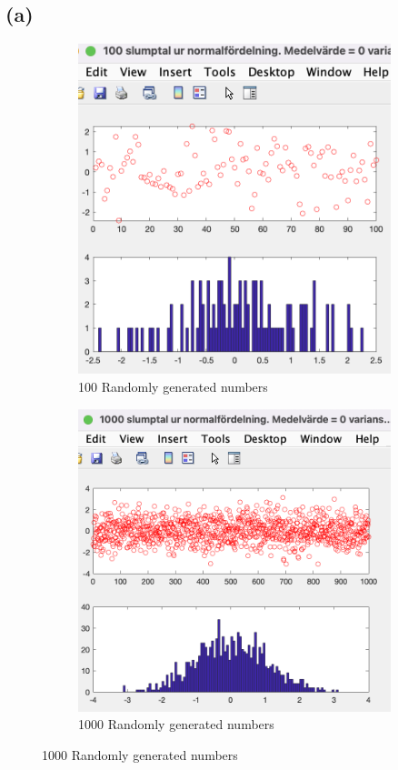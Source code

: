 \documentclass{article}
\begin{document}
\subsection{(a)}
\begin{figure}[h]
    \begin{subfigure}[h]{0.4\linewidth}
        \includegraphics[width=\linewidth]{./imgs/q1a_100.png}
        \caption{100 Randomly generated numbers}
    \end{subfigure}
    \hfill
    \begin{subfigure}[h]{0.4\linewidth}
        \includegraphics[width=\linewidth]{./imgs/q1a_1000.png}
        \caption{1000 Randomly generated numbers}
    \end{subfigure}
\end{figure}
\end{document}
